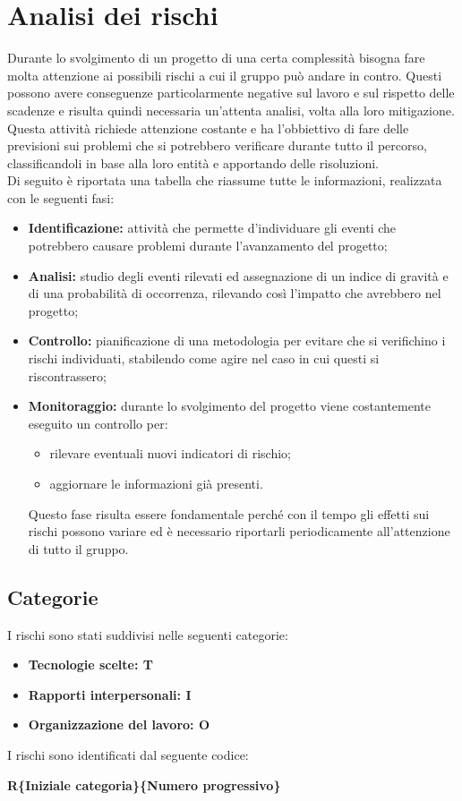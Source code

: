 \section{Analisi dei rischi}
Durante lo svolgimento di un progetto di una certa complessità bisogna fare molta attenzione ai possibili rischi a cui il gruppo può andare in contro. Questi possono avere conseguenze particolarmente negative sul lavoro e sul rispetto delle scadenze e risulta quindi necessaria un'attenta analisi, volta alla loro mitigazione.\\Questa attività richiede attenzione costante e ha l'obbiettivo di fare delle previsioni sui problemi che si potrebbero verificare durante tutto il percorso, classificandoli in base alla loro entità e apportando delle risoluzioni.\\
Di seguito è riportata una tabella che riassume tutte le informazioni, realizzata con le seguenti fasi:
\begin{itemize}
\item \textbf{Identificazione:} attività che permette d'individuare gli eventi che potrebbero causare problemi durante l'avanzamento del progetto;
\item \textbf{Analisi:} studio degli eventi rilevati ed assegnazione di un indice di gravità e di una probabilità di occorrenza, rilevando così l'impatto che avrebbero nel progetto;
\item \textbf{Controllo:} pianificazione di una metodologia per evitare che
si verifichino i rischi individuati, stabilendo come agire nel caso in cui questi si riscontrassero;
\item \textbf{Monitoraggio:} durante lo svolgimento del progetto viene costantemente eseguito un controllo per:
	\begin{itemize}
		\item rilevare eventuali nuovi indicatori di rischio;
		\item aggiornare le informazioni già presenti.
	\end{itemize}
Questo fase risulta essere fondamentale perché con il tempo gli effetti sui rischi possono variare ed è necessario riportarli periodicamente all'attenzione di tutto il gruppo.
\end{itemize}

\subsection{Categorie}
I rischi sono stati suddivisi nelle seguenti categorie:
\begin{itemize}
\item \textbf{Tecnologie scelte: T}
\item \textbf{Rapporti interpersonali: I}
\item \textbf{Organizzazione del lavoro: O}
\end{itemize}
I rischi sono identificati dal seguente codice:
\begin{center}
	\textbf{R\{Iniziale categoria\}\{Numero progressivo\}}
\end{center}
